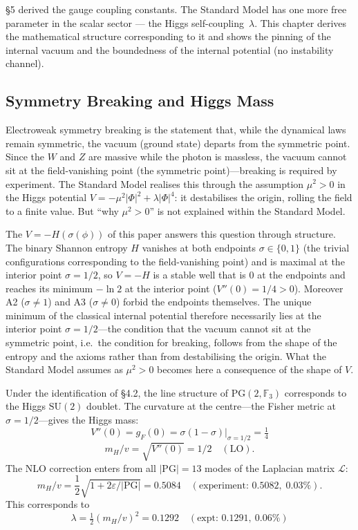 \documentclass[12pt,a4paper]{article}
\begin{document}
\S5 derived the gauge coupling constants. The Standard Model has one more
free parameter in the scalar sector --- the Higgs self-coupling~$\lambda$.
This chapter derives the mathematical structure corresponding to it and shows the pinning of the internal vacuum and the boundedness of the internal potential (no instability channel).

\subsection{Symmetry Breaking and Higgs Mass}\label{sec:higgs-mass}

Electroweak symmetry breaking is the statement that, while the dynamical laws remain symmetric, the vacuum (ground state) departs from the symmetric point. Since the $W$ and $Z$ are massive while the photon is massless, the vacuum cannot sit at the field-vanishing point (the symmetric point)---breaking is required by experiment. The Standard Model realises this through the assumption $\mu^2 > 0$ in the Higgs potential $V = -\mu^2|\Phi|^2 + \lambda|\Phi|^4$: it destabilises the origin, rolling the field to a finite value. But ``why $\mu^2 > 0$'' is not explained within the Standard Model.

The $V = -H(\sigma(\phi))$ of this paper answers this question through structure. The binary Shannon entropy $H$ vanishes at both endpoints $\sigma \in \{0,1\}$ (the trivial configurations corresponding to the field-vanishing point) and is maximal at the interior point $\sigma = 1/2$, so $V = -H$ is a stable well that is 0 at the endpoints and reaches its minimum $-\ln 2$ at the interior point ($V''(0) = 1/4 > 0$). Moreover A2 ($\sigma \neq 1$) and A3 ($\sigma \neq 0$) forbid the endpoints themselves. The unique minimum of the classical internal potential therefore necessarily lies at the interior point $\sigma = 1/2$---the condition that the vacuum cannot sit at the symmetric point, i.e.\ the condition for breaking, follows from the shape of the entropy and the axioms rather than from destabilising the origin. What the Standard Model assumes as $\mu^2 > 0$ becomes here a consequence of the shape of $V$.

Under the identification of \S4.2, the line structure of $\mathrm{PG}(2,\mathbb{F}_3)$
corresponds to the Higgs $\mathrm{SU}(2)$ doublet. The curvature at the
centre---the Fisher metric at $\sigma = 1/2$---gives the Higgs mass:
\[V''(0) = g_F(0) = \sigma(1-\sigma)\big|_{\sigma=1/2} = \tfrac{1}{4}\]
\begin{equation}
  m_H/v = \sqrt{V''(0)} = 1/2 \quad (\mathrm{LO}).
\end{equation}
The NLO correction enters from all $|\mathrm{PG}| = 13$ modes of the Laplacian matrix $\mathcal{L}$:
\begin{equation}\label{eq:higgs}
  m_H/v = \frac{1}{2}\sqrt{1 + 2\varepsilon/|\mathrm{PG}|}
  = 0.5084 \quad (\text{experiment: } 0.5082,\; 0.03\%).
\end{equation}
This corresponds to
\[\lambda = \tfrac{1}{2}(m_H/v)^2 = 0.1292\quad(\text{expt: } 0.1291,\ 0.06\%)\]
\end{document}
